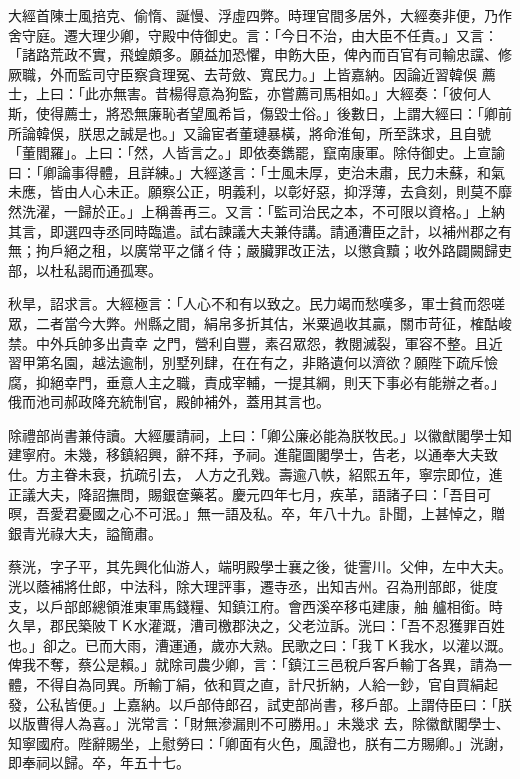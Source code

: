 \begin{pinyinscope}
 大經首陳士風掊克、偷惰、誕慢、浮虛四弊。時理官間多居外，大經奏非便，乃作舍守庭。遷大理少卿，守殿中侍御史。言：「今日不治，由大臣不任責。」又言：「諸路荒政不實，飛蝗頗多。願益加恐懼，申飭大臣，俾內而百官有司輸忠讜、修厥職，外而監司守臣察貪理冤、去苛斂、寬民力。」上皆嘉納。因論近習韓俁
 薦士，上曰：「此亦無害。昔楊得意為狗監，亦嘗薦司馬相如。」大經奏：「彼何人斯，使得薦士，將恐無廉恥者望風希旨，傷毀士俗。」後數日，上謂大經曰：「卿前所論韓俁，朕思之誠是也。」又論宦者董璉暴橫，將命淮甸，所至誅求，且自號「董閻羅」。上曰：「然，人皆言之。」即依奏鐫罷，竄南康軍。除侍御史。上宣諭曰：「卿論事得體，且詳練。」大經遂言：「士風未厚，吏治未肅，民力未蘇，和氣未應，皆由人心未正。願察公正，明義利，以彰好惡，抑浮薄，去貪刻，則莫不靡
 然洗濯，一歸於正。」上稱善再三。又言：「監司治民之本，不可限以資格。」上納其言，即選四寺丞同時臨遣。試右諫議大夫兼侍講。請通漕臣之計，以補州郡之有無；拘戶絕之租，以廣常平之儲彳侍；嚴臟罪改正法，以懲貪黷；收外路闢闕歸吏部，以杜私謁而通孤寒。



 秋旱，詔求言。大經極言：「人心不和有以致之。民力竭而愁嘆多，軍士貧而怨嗟眾，二者當今大弊。州縣之間，絹帛多折其估，米粟過收其贏，關市苛征，榷酤峻禁。中外兵帥多出貴幸
 之門，營利自豐，素召眾怨，教閱滅裂，軍容不整。且近習甲第名園，越法逾制，別墅列肆，在在有之，非賂遺何以濟欲？願陛下疏斥憸腐，抑絕幸門，垂意人主之職，責成宰輔，一提其綱，則天下事必有能辦之者。」俄而池司郝政降充統制官，殿帥補外，蓋用其言也。



 除禮部尚書兼侍讀。大經屢請祠，上曰：「卿公廉必能為朕牧民。」以徽猷閣學士知建寧府。未幾，移鎮紹興，辭不拜，予祠。進龍圖閣學士，告老，以通奉大夫致仕。方主眷未衰，抗疏引去，
 人方之孔戣。壽逾八帙，紹熙五年，寧宗即位，進正議大夫，降詔撫問，賜銀奩藥茗。慶元四年七月，疾革，語諸子曰：「吾目可暝，吾愛君憂國之心不可泯。」無一語及私。卒，年八十九。訃聞，上甚悼之，贈銀青光祿大夫，謚簡肅。



 蔡洸，字子平，其先興化仙游人，端明殿學士襄之後，徙霅川。父伸，左中大夫。洸以蔭補將仕郎，中法科，除大理評事，遷寺丞，出知吉州。召為刑部郎，徙度支，以戶部郎總領淮東軍馬錢糧、知鎮江府。會西溪卒移屯建康，舳
 艫相銜。時久旱，郡民築陂ＴＫ水灌溉，漕司檄郡決之，父老泣訴。洸曰：「吾不忍獲罪百姓也。」卻之。已而大雨，漕運通，歲亦大熟。民歌之曰：「我ＴＫ我水，以灌以溉。俾我不奪，蔡公是賴。」就除司農少卿，言：「鎮江三邑稅戶客戶輸丁各異，請為一體，不得自為同異。所輸丁絹，依和買之直，計尺折納，人給一鈔，官自買絹起發，公私皆便。」上嘉納。以戶部侍郎召，試吏部尚書，移戶部。上謂侍臣曰：「朕以版曹得人為喜。」洸常言：「財無滲漏則不可勝用。」未幾求
 去，除徽猷閣學士、知寧國府。陛辭賜坐，上慰勞曰：「卿面有火色，風證也，朕有二方賜卿。」洸謝，即奉祠以歸。卒，年五十七。




\end{pinyinscope}
